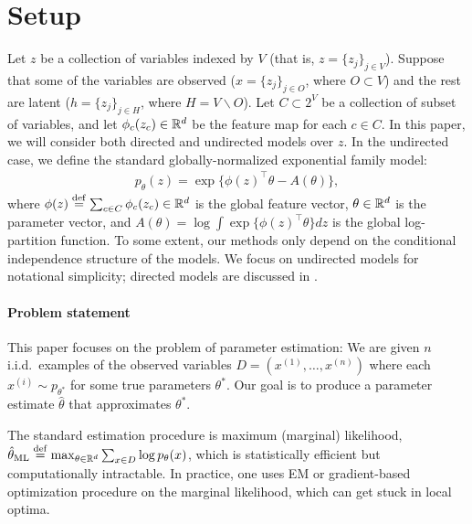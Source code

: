 \section{Setup} \label{sec:setup}

Let $z$ be a collection of variables indexed by $V$ (that is, $z = \{z_j\}_{j \in V}$).
Suppose that some of the variables are observed ($x = \{ z_j \}_{j \in O}$, where $O \subset V$) 
and the rest are latent ($h = \{ z_j \}_{j \in H}$, where $H = V \backslash O$).
Let $C \subset 2^V$ be a collection of subset of variables,
and let $\phi_c(z_c) \in \mathbb{R}^d$ be the feature map for each $c \in C$.
In this paper, we will consider both directed and undirected models over $z$.
In the undirected case, we define the standard globally-normalized exponential family model:
\begin{align}
  \label{eqn:undirectedSetup}
  p_\theta(z) = \exp\{ \phi(z)^\top\theta - A(\theta) \},
\end{align}
where $\phi(z) \stackrel{\rm def}{=} \sum_{c \in C} \phi_c(z_c) \in \mathbb{R}^d$ is the global feature vector, $\theta \in \mathbb{R}^d$ is the parameter vector,
and $A(\theta) = \log \int \exp\{\phi(z)^\top\theta\} dz$ is the global log-partition function.
To some extent, our methods only depend on the conditional independence
structure of the models.
We focus on undirected models for notational simplicity;
directed models are discussed in .

\paragraph{Problem statement}

This paper focuses on the problem of parameter estimation:
We are given $n$ i.i.d.~examples of the observed variables $D = (x^{(1)}, \dots, x^{(n)})$
where each $x^{(i)} \sim p_{\theta^*}$ for some true parameters $\theta^*$.
Our goal is to produce a parameter estimate $\hat\theta$ that approximates $\theta^*$.

The standard estimation procedure is maximum (marginal) likelihood,
$\hat\theta_\text{\rm ML} \stackrel{\rm def}{=} \max_{\theta \in \mathbb{R}^d} \sum_{x \in D} \log p_\theta(x)$,
which is statistically efficient but computationally intractable.
In practice, one uses EM or gradient-based optimization procedure on the marginal likelihood,
which can get stuck in local optima.
